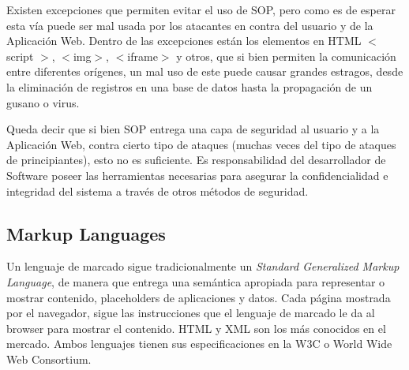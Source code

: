     Existen excepciones que permiten evitar el uso de SOP, pero como es de esperar esta vía puede ser mal usada por los atacantes en contra del usuario y de la Aplicación Web. Dentro de las excepciones están los elementos en HTML \(<\) script \(>\), \(<\)img\(>\), \(<\)iframe\(>\) y otros, que si bien permiten la comunicación entre diferentes orígenes, un mal uso de este puede causar grandes estragos, desde la eliminación de registros en una base de datos hasta la propagación de un gusano o virus.
        
    Queda decir que si bien SOP entrega una capa de seguridad al usuario y a la Aplicación Web, contra cierto tipo de ataques (muchas veces del tipo de ataques de principiantes), esto no es suficiente. Es responsabilidad del desarrollador de Software poseer las herramientas necesarias para asegurar la confidencialidad e integridad del sistema a través de otros métodos de seguridad.
    


    \subsection{Markup Languages}
    \label{chap2:markup}
        Un lenguaje de marcado sigue tradicionalmente un \textit{Standard Generalized Markup Language}, de manera que entrega una semántica apropiada para representar o mostrar contenido, placeholders de aplicaciones y datos. Cada página mostrada por el navegador, sigue las instrucciones que el lenguaje de marcado le da al browser para mostrar el contenido. HTML y XML son los más conocidos en el mercado. Ambos lenguajes tienen sus especificaciones en la W3C o World Wide Web Consortium.

